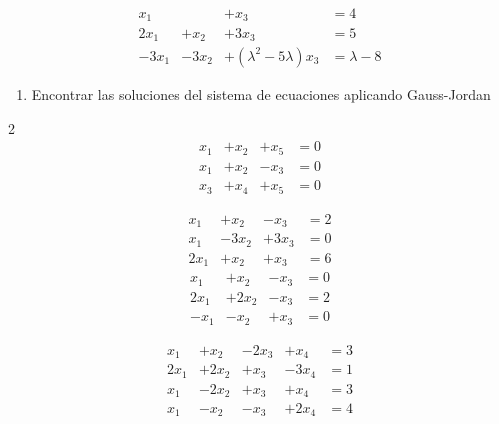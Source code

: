 \documentclass[
]{article}
\providecommand{\tightlist}{%
  \setlength{\itemsep}{0pt}\setlength{\parskip}{0pt}}
\begin{document}
\begin{equation*}
  \begin{array}{cccc}
     x_1   &          & + x_3  & = 4  \\
     2x_1  & + x_2    & +3x_3  & = 5\\
    -3x_1  & -3x_2    & +(\lambda^2-5\lambda)x_3         & = \lambda-8
  \end{array}
\end{equation*}

\begin{enumerate}
\def\labelenumi{\arabic{enumi}.}
\setcounter{enumi}{4}
\tightlist
\item
  Encontrar las soluciones del sistema de ecuaciones aplicando
  Gauss-Jordan
\end{enumerate}

\begin{multicols}{2}
\begin{equation}
  \begin{array}{cccc}
     x_1   & + x_2   & +x_5    &= 0  \\
     x_1   & + x_2   & -x_3    & = 0\\
     x_3   & + x_4   & +x_5    & = 0
  \end{array}
\end{equation}\quad

\begin{equation}
  \begin{array}{cccc}
     x_1   & + x_2   & -x_3    &= 2  \\
     x_1   & -3 x_2   & +3x_3    & = 0\\
     2x_1   & + x_2   & +x_3    & = 6
  \end{array}
\end{equation}
\begin{equation}
  \begin{array}{cccc}
     x_1   & + x_2   & -x_3    &= 0  \\
     2x_1  & +2 x_2   & -x_3    & = 2\\
     -x_1   & - x_2   & +x_3    & = 0
  \end{array}
\end{equation}

\begin{equation}
  \begin{array}{ccccl}
     x_1   & + x_2    & -2x_3 & +x_4    &= 3  \\
     2x_1  & +2 x_2   & +x_3  &-3x_4    & = 1\\
     x_1   & - 2x_2    & +x_3 &+x_4     & = 3 \\
     x_1   & - x_2    & -x_3 &+2x_4     & = 4 
  \end{array}
\end{equation}
\end{multicols}
\end{document}
